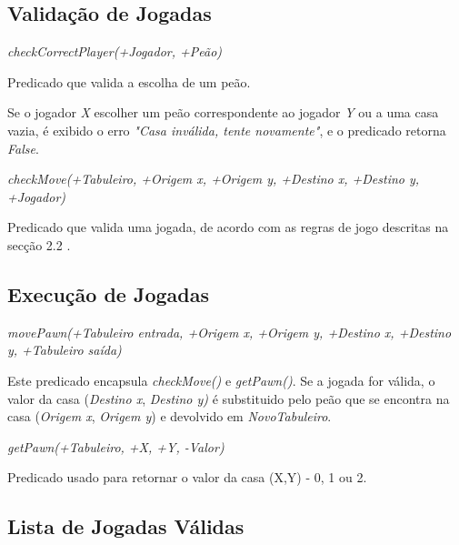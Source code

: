 \documentclass[15pt,a4paper]{article}
\begin{document}
\newpage


\subsection{Validação de Jogadas}
 \textit{checkCorrectPlayer(+Jogador, +Peão)}

Predicado que valida a escolha de um peão.

Se o jogador \textit{X} escolher um peão correspondente ao jogador \textit{Y} ou a uma casa vazia, é exibido o erro \textit{"Casa inválida, tente novamente"}, e o predicado retorna \textit{False}.

\textit{ checkMove(+Tabuleiro, +Origem x, +Origem y, +Destino x, +Destino y, +Jogador) }

Predicado que valida uma jogada, de acordo com as regras de jogo descritas na secção 2.2 .


\subsection{Execução de Jogadas}

\textit{movePawn(+Tabuleiro entrada, +Origem x, +Origem y, +Destino x, +Destino y, +Tabuleiro saída)}

Este predicado encapsula \textit{checkMove()} e \textit{getPawn()}.
Se a jogada for válida, o valor da casa (\textit{Destino x}, \textit{Destino y)} é substituido pelo
peão que se encontra na casa (\textit{Origem x}, \textit{Origem y}) e devolvido em \textit{NovoTabuleiro}.

\textit{getPawn(+Tabuleiro, +X, +Y, -Valor)}

Predicado usado para retornar o valor da casa (X,Y) - 0, 1 ou 2.


\subsection{Lista de Jogadas Válidas}
\end{document}

